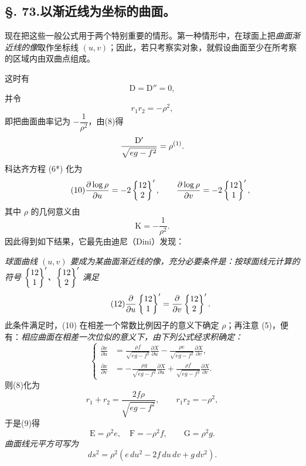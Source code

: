 \subsection*{\S. 73.\quad 以渐近线为坐标的曲面。}

现在把这些一般公式用于两个特别重要的情形。第一种情形中，在球面上把\emph{曲面渐近线的像}取作坐标线 \((u,v)\)；因此，若只考察实对象，就假设曲面至少在所考察的区域内由双曲点组成。

这时有
\[
 \mathrm D=\mathrm D''=0,
\]
并令
\[
 r_1r_2=-\rho^2,
\]
即把曲面曲率记为 \(-\dfrac1{\rho^2}\)，由(8)得
\[
 \frac{\mathrm D'}{\sqrt{eg-f^2}}=\rho\srcfnmark{1}.
\]
科达齐方程 (6*) 化为
\begin{equation}\tag{10}
 \frac{\partial\log\rho}{\partial u}=-2\left\{\begin{matrix}12\\2\end{matrix}\right\}',
 \qquad
 \frac{\partial\log\rho}{\partial v}=-2\left\{\begin{matrix}12\\1\end{matrix}\right\}',
\end{equation}
其中 \(\rho\) 的几何意义由
\begin{equation}\tag{11}
 \mathrm K=-\frac1{\rho^2}.
\end{equation}
因此得到如下结果，它最先由迪尼（Dini）发现：

\emph{球面曲线 \((u,v)\) 要成为某曲面渐近线的像，充分必要条件是：按球面线元计算的符号 \(\left\{\begin{matrix}12\\1\end{matrix}\right\}'\)、\(\left\{\begin{matrix}12\\2\end{matrix}\right\}'\) 满足}
\begin{equation}\tag{12}
 \frac{\partial}{\partial u}\left\{\begin{matrix}12\\1\end{matrix}\right\}'=\frac{\partial}{\partial v}\left\{\begin{matrix}12\\2\end{matrix}\right\}'.
\end{equation}
此条件满足时，(10) 在相差一个常数比例因子的意义下确定 \(\rho\)；再注意 (5)，便有：\emph{相应曲面在相差一次位似的意义下，由下列公式经求积确定：}
\begin{equation}\tag{13}
\left\{
\begin{aligned}
\frac{\partial x}{\partial u}&=\frac{\rho f}{\sqrt{eg-f^2}}\frac{\partial X}{\partial u}-\frac{\rho e}{\sqrt{eg-f^2}}\frac{\partial X}{\partial v},\\
\frac{\partial x}{\partial v}&=-\frac{\rho g}{\sqrt{eg-f^2}}\frac{\partial X}{\partial u}+\frac{\rho f}{\sqrt{eg-f^2}}\frac{\partial X}{\partial v}.
\end{aligned}\right.
\end{equation}
则(8)化为
\[
 r_1+r_2=\frac{2f\rho}{\sqrt{eg-f^2}},\qquad r_1r_2=-\rho^2,
\]
于是(9)得
\[
 \mathrm E=\rho^2e,\quad \mathrm F=-\rho^2f,
 \qquad \mathrm G=\rho^2g.
\]
\emph{曲面线元平方可写为}
\begin{equation}\tag{14}
 ds^2=\rho^2(e\,du^2-2f\,du\,dv+g\,dv^2).
\end{equation}


